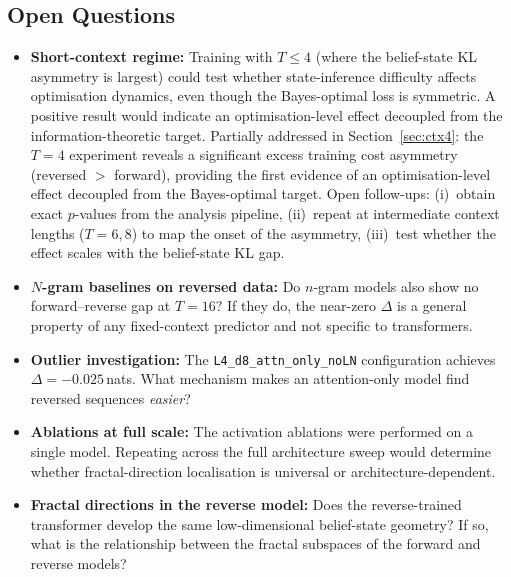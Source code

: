 \documentclass[11pt]{article}
\newcommand{\claude}[1]{{\color{red}\textsf{#1}}}
\newcommand{\old}[1]{{\color{gray}#1}}
\begin{document}
\subsection{Open Questions}

\begin{itemize}
  \item \old{\textbf{Short-context regime:} Training with $T \le 4$ (where the belief-state KL asymmetry is largest) could test whether state-inference difficulty affects optimisation dynamics, even though the Bayes-optimal loss is symmetric.  A positive result would indicate an optimisation-level effect decoupled from the information-theoretic target.} \claude{Partially addressed in Section~\ref{sec:ctx4}: the $T = 4$ experiment reveals a significant excess training cost asymmetry (reversed $> $ forward), providing the first evidence of an optimisation-level effect decoupled from the Bayes-optimal target.  Open follow-ups: (i)~obtain exact $p$-values from the analysis pipeline, (ii)~repeat at intermediate context lengths ($T = 6, 8$) to map the onset of the asymmetry, (iii)~test whether the effect scales with the belief-state KL gap.}

  \item \textbf{$N$-gram baselines on reversed data:} Do $n$-gram models also show no forward--reverse gap at $T = 16$?  If they do, the near-zero $\Delta$ is a general property of any fixed-context predictor and not specific to transformers.

  \item \textbf{Outlier investigation:} The \texttt{L4\_d8\_attn\_only\_noLN} configuration achieves $\Delta = -0.025$\,nats.  What mechanism makes an attention-only model find reversed sequences \emph{easier}?

  \item \textbf{Ablations at full scale:} The activation ablations were performed on a single model.  Repeating across the full architecture sweep would determine whether fractal-direction localisation is universal or architecture-dependent.

  \item \textbf{Fractal directions in the reverse model:} Does the reverse-trained transformer develop the same low-dimensional belief-state geometry?  If so, what is the relationship between the fractal subspaces of the forward and reverse models?
\end{itemize}
\end{document}
